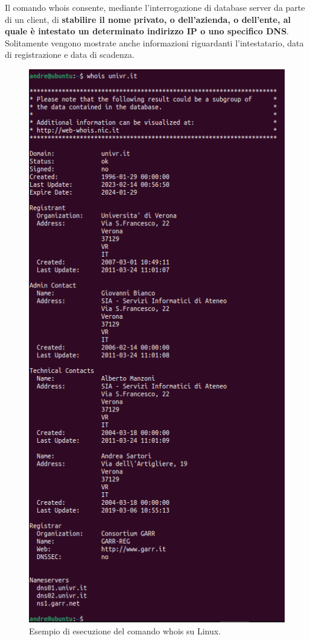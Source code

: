 \documentclass[a4paper]{article}
\begin{document}
	Il comando \textsf{whois} consente, mediante l'interrogazione di database server da parte di un client, di \textbf{stabilire il nome privato, o dell'azienda, o dell'ente, al quale è intestato un determinato indirizzo IP o uno specifico DNS}. Solitamente vengono mostrate anche informazioni riguardanti l'intestatario, data di registrazione e data di scadenza.
	
	\begin{figure}
		\centering
		\includegraphics[width=.78\textwidth]{img/altri-strumenti/whois.png}
		\caption{Esempio di esecuzione del comando \textsf{whois} su Linux.}
	\end{figure}\newpage
	
\end{document}
